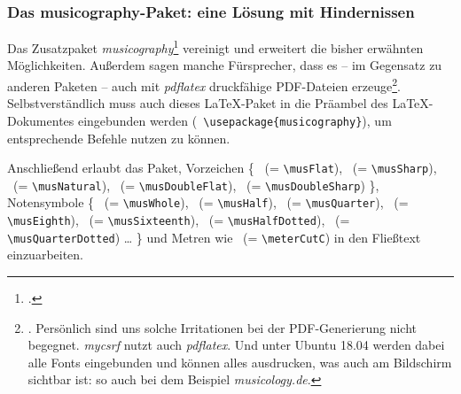 %
%
%



\subsubsection{Das musicography-Paket: eine Lösung mit Hindernissen}

Das Zusatzpaket \emph{musicography}\footcite[vgl.][\nopage
wp]{CtanMusicography2018a} vereinigt und erweitert die bisher erwähnten
Möglichkeiten. Außerdem sagen manche Fürsprecher, dass es -- im Gegensatz zu
anderen Paketen -- auch mit \emph{pdflatex} druckfähige PDF-Dateien
erzeuge\footnote{\cite[Vgl. dazu etwa][1]{Cashner2018a}. Persönlich sind uns
solche Irritationen bei der PDF-Generierung nicht begegnet.
\emph{mycsrf} nutzt auch \emph{pdflatex}. Und unter Ubuntu 18.04 werden dabei
alle Fonts eingebunden und können alles ausdrucken, was auch am Bildschirm
sichtbar ist: so auch bei dem Beispiel \emph{musicology.de}.}.
Selbstverständlich muss auch dieses \LaTeX-Paket in die Präambel des
\LaTeX-Dokumentes eingebunden werden (\texttt{\small
\textbackslash{usepackage\{musicography\}}}), um entsprechende Befehle nutzen zu
können.

Anschließend erlaubt das Paket, Vorzeichen \{
\musFlat \ (= \texttt{\small \textbackslash{musFlat}}),
\musSharp \ (= \texttt{\small \textbackslash{musSharp}}),
\musNatural \ (= \texttt{\small \textbackslash{musNatural}}),
\musDoubleFlat \ (= \texttt{\small \textbackslash{musDoubleFlat}}),
\musDoubleSharp \ (= \texttt{\small \textbackslash{musDoubleSharp}})
\}, Notensymbole \{
\musWhole \ (= \texttt{\small \textbackslash{musWhole}}),
\musHalf \ (= \texttt{\small \textbackslash{musHalf}}),
\musQuarter \ (= \texttt{\small \textbackslash{musQuarter}}),
\musEighth \ (= \texttt{\small \textbackslash{musEighth}}),
\musSixteenth \ (= \texttt{\small \textbackslash{musSixteenth}}),
\musHalfDotted \ (= \texttt{\small \textbackslash{musHalfDotted}}),
\musQuarterDotted \ (= \texttt{\small \textbackslash{musQuarterDotted}})
\ldots
\}
und Metren wie \meterCutC \ (= \texttt{\small \textbackslash{meterCutC}})
in den Fließtext einzuarbeiten.

